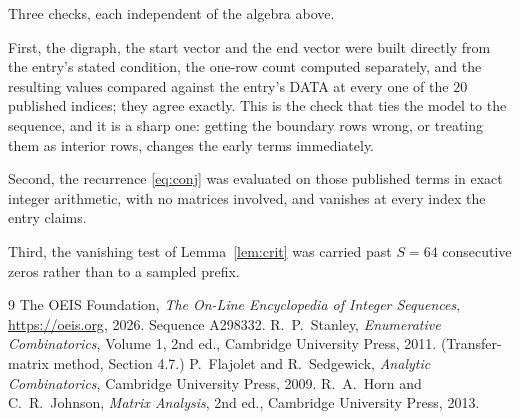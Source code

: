 \documentclass[11pt,a4paper]{article}
\theoremstyle{plain}
\theoremstyle{definition}
\begin{document}
Three checks, each independent of the algebra above.

First, the digraph, the start vector and the end vector were built directly from the
entry's stated condition, the one-row count computed separately, and the resulting values
compared against the entry's DATA at every one of the $20$ published indices; they
agree exactly. This is the check that ties the model to the sequence, and it is a sharp one:
getting the boundary rows wrong, or treating them as interior rows, changes the early terms
immediately.

Second, the recurrence \eqref{eq:conj} was evaluated on those published terms in exact
integer arithmetic, with no matrices involved, and vanishes at every index the entry claims.

Third, the vanishing test of Lemma~\ref{lem:crit} was carried past $S=64$ consecutive
zeros rather than to a sampled prefix.

\begin{thebibliography}{9}
 The OEIS Foundation, \emph{The On-Line Encyclopedia of Integer
Sequences}, \url{https://oeis.org}, 2026. Sequence A298332.
 R.~P.~Stanley, \emph{Enumerative Combinatorics}, Volume 1, 2nd ed.,
Cambridge University Press, 2011. (Transfer-matrix method, Section 4.7.)
 P.~Flajolet and R.~Sedgewick, \emph{Analytic Combinatorics}, Cambridge
University Press, 2009.
 R.~A.~Horn and C.~R.~Johnson, \emph{Matrix Analysis}, 2nd ed., Cambridge
University Press, 2013.
\end{thebibliography}
\end{document}
